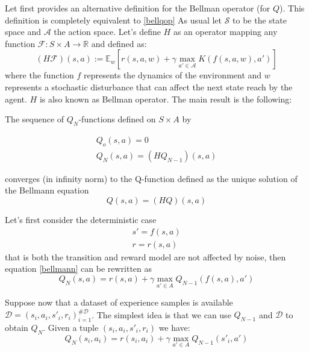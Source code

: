 	\noindent Let first provides an alternative definition for the Bellman operator (for $Q$). This
	definition is completely equivalent to \ref{bellqop}
	As usual let $\mathcal{S}$ to be the state space and $\mathcal{A}$ the action space. Let's define
	$H$ as an operator mapping any function $\mathcal{F}: S \times A \rightarrow \mathbb{R}$ and defined as:
	\begin{equation}
		(H\mathcal{F})(s,a) := \mathbb{E}_{w} [r(s,a,w) + \gamma \max_{a' \in \mathcal{A}} K(f(s,a,w),a')]
		\label{bellmann}
	\end{equation}
	where the function $f$ represents the dynamics of the environment and $w$ represents a stochastic disturbance
	that can affect the next state reach by the agent. $H$ is also known as Bellman operator.\newline
	The main result is the following:

	\begin{theorem} 
		The sequence of $Q_N$-functions defined on $S \times A$ by

		\begin{equation}
			\begin{split}
				Q_o(s,a) = 0 \\
				Q_{N}(s,a) = (HQ_{N-1})(s,a)
			\end{split}
		\end{equation}

		converges (in infinity norm) to the Q-function defined as the unique solution of the Bellmann equation
		\begin{equation}
			Q(s,a) = (HQ)(s,a)
		\end{equation}
	\end{theorem}

	\noindent Let's first consider the deterministic case
	\begin{equation}
		\begin{split}
			s' = f(s,a) \\
			r = r(s,a)
		\end{split}
	\end{equation}
	that is both the transition and reward model are not affected by noise, then equation \ref{bellmann} can be rewritten as
	\begin{equation}
		Q_{N}(s,a) = r(s,a) + \gamma \max_{a' \in A} Q_{N-1} (f(s,a),a')
		\label{bellmann2}
	\end{equation}

	\noindent Suppose now that a dataset of experience samples is available $\mathcal{D} = {(s_i,a_i,s'_i,r_i)}_{i=1}^{\#\mathcal{D}}$.
	The simplest idea is that we can use $Q_{N-1}$ and $\mathcal{D}$ to obtain $Q_N$. Given a tuple $(s_i,a_i,s'_i,r_i)$ we have:
	\begin{equation}
		Q_{N}(s_i,a_i) = r(s_i,a_i) + \gamma \max_{a' \in A} Q_{N-1}(s'_i,a')
		\label{bellmann3}
	\end{equation}

